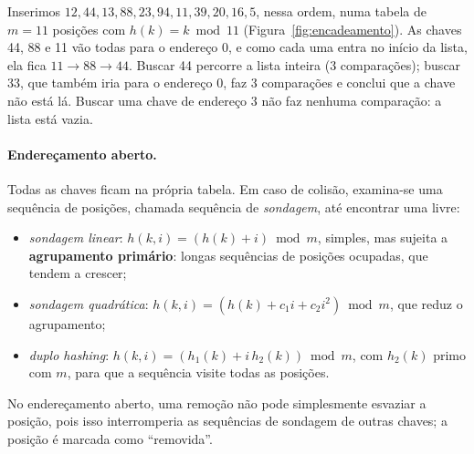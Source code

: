 \begin{exemplo}\label{ex:encadeamento}
Inserimos $12,44,13,88,23,94,11,39,20,16,5$, nessa ordem, numa tabela de $m=11$ posições com $h(k)=k\bmod11$ (Figura~\ref{fig:encadeamento}). As chaves 44, 88 e 11 vão todas para o endereço 0, e como cada uma entra no início da lista, ela fica $11\to88\to44$. Buscar 44 percorre a lista inteira (3 comparações); buscar 33, que também iria para o endereço 0, faz 3 comparações e conclui que a chave não está lá. Buscar uma chave de endereço 3 não faz nenhuma comparação: a lista está vazia.
\begin{figura}[Encadeamento exterior com $m=11$. Cada posição aponta para a lista das chaves que receberam aquele endereço; as inserções são feitas no início da lista.\label{fig:encadeamento}]
\end{figura}
\end{exemplo}

\paragraph{Endereçamento aberto.} Todas as chaves ficam na própria tabela. Em caso de colisão, examina-se uma sequência de posições, chamada sequência de \emph{sondagem}, até encontrar uma livre:
\begin{itemize}
  \item \emph{sondagem linear}: $h(k,i)=(h(k)+i)\bmod m$, simples, mas sujeita a \textbf{agrupamento primário}: longas sequências de posições ocupadas, que tendem a crescer;
  \item \emph{sondagem quadrática}: $h(k,i)=(h(k)+c_1i+c_2i^2)\bmod m$, que reduz o agrupamento;
  \item \emph{duplo hashing}: $h(k,i)=(h_1(k)+i\,h_2(k))\bmod m$, com $h_2(k)$ primo com $m$, para que a sequência visite todas as posições.
\end{itemize}
No endereçamento aberto, uma remoção não pode simplesmente esvaziar a posição, pois isso interromperia as sequências de sondagem de outras chaves; a posição é marcada como ``removida''.

